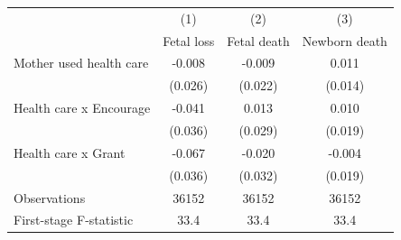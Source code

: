 \begin{tabular*}{\hsize}{@{\hskip\tabcolsep\extracolsep\fill}l*{3}{c}}
\toprule
                    &\multicolumn{1}{c}{(1)}&\multicolumn{1}{c}{(2)}&\multicolumn{1}{c}{(3)}\\
                    &\multicolumn{1}{c}{Fetal loss}&\multicolumn{1}{c}{Fetal death}&\multicolumn{1}{c}{Newborn death}\\
\midrule
Mother used health care&      -0.008&      -0.009&       0.011\\
                    &     (0.026)&     (0.022)&     (0.014)\\
\addlinespace
Health care x Encourage&      -0.041&       0.013&       0.010\\
                    &     (0.036)&     (0.029)&     (0.019)\\
\addlinespace
Health care x Grant &      -0.067&      -0.020&      -0.004\\
                    &     (0.036)&     (0.032)&     (0.019)\\
\midrule
Observations        &       36152&       36152&       36152\\
First-stage F-statistic&        33.4&        33.4&        33.4\\
\bottomrule
\end{tabular*}
